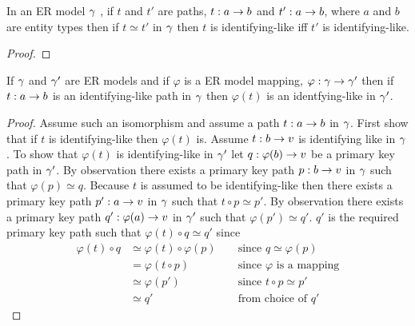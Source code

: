 \begin{lemma}
In an ER model $\gamma$ , if $t$ and $t'$ are paths, $t:a \rightarrow b$ and $t':a \rightarrow b$, where $a$ and $b$ are entity types
then if $t \simeq t'$ in $\gamma$ then $t$ is identifying-like iff $t'$ is identifying-like.
\end{lemma}
\begin{proof}
\tbd
\end{proof}


 
\begin{lemma}
If $\gamma$ and $\gamma'$ are ER models and  if  $\varphi$ is a ER model mapping, $\varphi: \gamma \rightarrow \gamma'$ then if $t:a \rightarrow b$ is an identifying-like  path in $\gamma$ then $\varphi(t)$ is an identfying-like in $\gamma'$.
\end{lemma}

\begin{proof}
Assume such an isomorphism and assume a path $t: a \rightarrow b$ in $\gamma$. 
First show that if $t$ is identifying-like then $\varphi(t)$ is. Assume $t: b \rightarrow v$ is identifying like in $\gamma$. To show that $\varphi(t)$
is identifying-like in $\gamma'$ let $q : \varphi(b) \rightarrow v$ be a primary key path in $\gamma'$. By observation  there exists a primary key path $p : b \rightarrow v$ in $\gamma$ such that $\varphi(p) \simeq q$. Because $t$ is assumed to be identifying-like then there exists a primary key path $p': a  \rightarrow  v$ in $\gamma$ such that $t \circ p \simeq p'$. By observation there exists a primary key path $q' : \varphi(a)  \rightarrow  v$ in $\gamma'$
such that $\varphi(p') \simeq q'$. $q'$ is the required primary key path such that $\varphi(t) \circ q \simeq q'$ since
\begin{align*}
\varphi(t) \circ q  & \simeq \varphi(t) \circ \varphi(p)       && \mbox{ since $q \simeq \varphi(p)$}    \\
                    & =      \varphi(t \circ  p)                && \mbox{ since $\varphi$ is a mapping} \\
                    & \simeq \varphi(p')                        && \mbox{ since $t \circ p \simeq p'$}           \\
                    & \simeq q'                                 && \mbox{ from choice of $q'$}   
\end{align*}
\end{proof}

